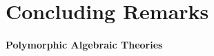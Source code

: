 
\section{Concluding Remarks} \label{sec:future}


\paragraph{Polymorphic Algebraic Theories}
\cite{Fiore2013,Hamana2011,Hamana2022}
